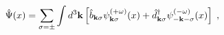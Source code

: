 \begin{equation}
\hat \Psi(x)= \sum_{\sigma = \pm } \int d^3 {\bf k}
\left[ \hat b_{{\bf k} \sigma} \psi^{(+\omega)}_{{\bf k} \sigma} (x)
     + \hat d^\dagger_{{\bf k} \sigma} \psi^{(-\omega)}_{-{\bf k} -\sigma} (x) 
\right]\;,
\label{FF}
\end{equation}

